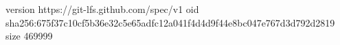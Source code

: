 version https://git-lfs.github.com/spec/v1
oid sha256:675f37c10cf5b36e32c5e65adfc12a041f4d4d9f44e8bc047e767d3d792d2819
size 469999
